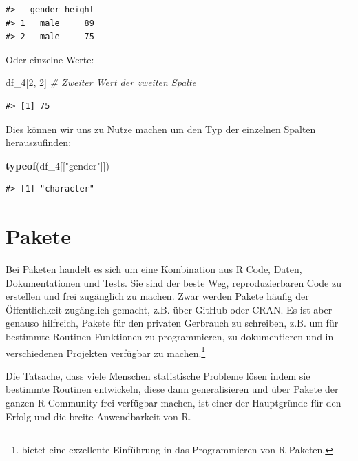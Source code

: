 \documentclass[]{tufte-book}
\newenvironment{Shaded}{}{}
\newcommand{\KeywordTok}[1]{\textcolor[rgb]{0.00,0.44,0.13}{\textbf{#1}}}
\newcommand{\DecValTok}[1]{\textcolor[rgb]{0.25,0.63,0.44}{#1}}
\newcommand{\StringTok}[1]{\textcolor[rgb]{0.25,0.44,0.63}{#1}}
\newcommand{\CommentTok}[1]{\textcolor[rgb]{0.38,0.63,0.69}{\textit{#1}}}
\newcommand{\NormalTok}[1]{#1}
\begin{document}
\begin{verbatim}
#>   gender height
#> 1   male     89
#> 2   male     75
\end{verbatim}

Oder einzelne Werte:

\begin{Shaded}
\begin{Highlighting}[]
\NormalTok{df_}\DecValTok{4}\NormalTok{[}\DecValTok{2}\NormalTok{, }\DecValTok{2}\NormalTok{]  }\CommentTok{# Zweiter Wert der zweiten Spalte}
\end{Highlighting}
\end{Shaded}

\begin{verbatim}
#> [1] 75
\end{verbatim}

Dies können wir uns zu Nutze machen um den Typ der einzelnen Spalten
herauszufinden:

\begin{Shaded}
\begin{Highlighting}[]
\KeywordTok{typeof}\NormalTok{(df_}\DecValTok{4}\NormalTok{[[}\StringTok{"gender"}\NormalTok{]])}
\end{Highlighting}
\end{Shaded}

\begin{verbatim}
#> [1] "character"
\end{verbatim}

\section{Pakete}\label{pakete}

Bei Paketen handelt es sich um eine Kombination aus R Code, Daten,
Dokumentationen und Tests. Sie sind der beste Weg, reproduzierbaren Code
zu erstellen und frei zugänglich zu machen. Zwar werden Pakete häufig
der Öffentlichkeit zugänglich gemacht, z.B. über GitHub oder CRAN. Es
ist aber genauso hilfreich, Pakete für den privaten Gerbrauch zu
schreiben, z.B. um für bestimmte Routinen Funktionen zu programmieren,
zu dokumentieren und in verschiedenen Projekten verfügbar zu
machen.\footnote{\citet{Packages} bietet eine exzellente Einführung in
  das Programmieren von R Paketen.}

Die Tatsache, dass viele Menschen statistische Probleme lösen indem sie
bestimmte Routinen entwickeln, diese dann generalisieren und über Pakete
der ganzen R Community frei verfügbar machen, ist einer der Hauptgründe
für den Erfolg und die breite Anwendbarkeit von R.
\end{document}
